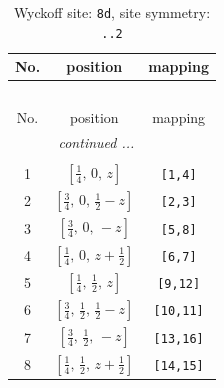 \documentclass[fleqn,8pt]{jsarticle}
\begin{document}
\begin{longtable}{ccc}
\caption{Wyckoff site: {\tt 8d}, site symmetry: {\tt ..2}}
 \\
 \hline \hline
No. & position & mapping \\ \hline \endfirsthead

\multicolumn{2}{l}{\tablename\ \thetable{}} \\
 \hline \hline
No. & position & mapping \\ \hline \endhead

 \hline \hline
\multicolumn{2}{r}{\footnotesize\it continued ...} \\ \endfoot

 \hline \hline
\multicolumn{2}{r}{} \\ \endlastfoot

1 & $\left[ \frac{1}{4},\, 0,\, z \right]$ & {\tt [1,4]} \\ \hline
2 & $\left[ \frac{3}{4},\, 0,\, \frac{1}{2} - z \right]$ & {\tt [2,3]} \\ \hline
3 & $\left[ \frac{3}{4},\, 0,\, - z \right]$ & {\tt [5,8]} \\ \hline
4 & $\left[ \frac{1}{4},\, 0,\, z + \frac{1}{2} \right]$ & {\tt [6,7]} \\ \hline
5 & $\left[ \frac{1}{4},\, \frac{1}{2},\, z \right]$ & {\tt [9,12]} \\ \hline
6 & $\left[ \frac{3}{4},\, \frac{1}{2},\, \frac{1}{2} - z \right]$ & {\tt [10,11]} \\ \hline
7 & $\left[ \frac{3}{4},\, \frac{1}{2},\, - z \right]$ & {\tt [13,16]} \\ \hline
8 & $\left[ \frac{1}{4},\, \frac{1}{2},\, z + \frac{1}{2} \right]$ & {\tt [14,15]} \\
\end{longtable}
\renewcommand{\arraystretch}{1.2}
\end{document}
